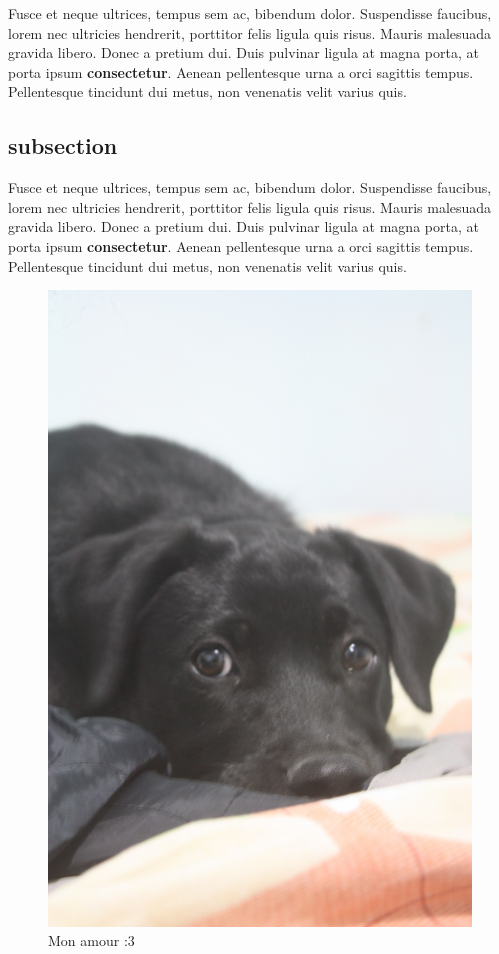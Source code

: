\documentclass[12pt,letterpaper,oneside]{book}
\begin{document}
\noindent Fusce et neque ultrices, tempus sem ac, bibendum dolor. Suspendisse faucibus, lorem nec ultricies hendrerit, porttitor felis ligula quis risus. Mauris malesuada gravida libero. Donec a pretium dui. Duis pulvinar ligula at magna porta, at porta ipsum \textbf{consectetur}. Aenean pellentesque urna a orci sagittis tempus. Pellentesque tincidunt dui metus, non venenatis velit varius quis.

\subsection{subsection}
\noindent Fusce et neque ultrices, tempus sem ac, bibendum dolor. Suspendisse faucibus, lorem nec ultricies hendrerit, porttitor felis ligula quis risus. Mauris malesuada gravida libero. Donec a pretium dui. Duis pulvinar ligula at magna porta, at porta ipsum \textbf{consectetur}. Aenean pellentesque urna a orci sagittis tempus. Pellentesque tincidunt dui metus, non venenatis velit varius quis.

\begin{figure}[h]
\centering
\includegraphics[scale=.06]{img/milla.jpg}
\caption{Mon amour :3}
\end{figure}
\end{document}
